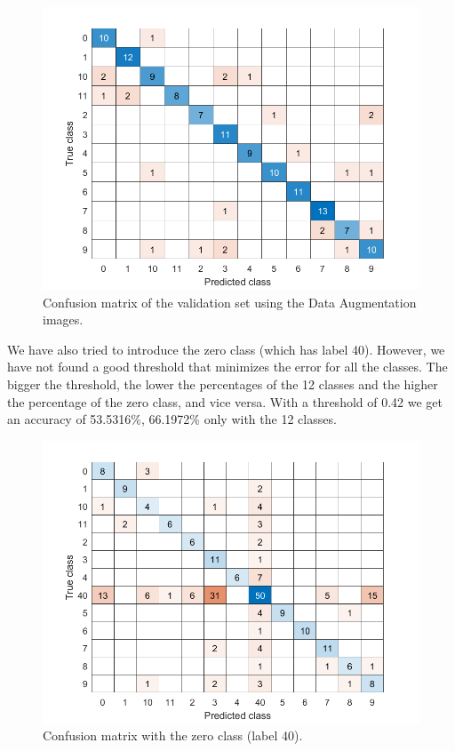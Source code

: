 \documentclass[11]{article}
\begin{document}
\begin{figure}[H]
\begin{minipage}{0.4\linewidth}
  \includegraphics[scale=0.33]{images/secondOne.png}
  \caption{Confusion matrix of the validation set using the Data Augmentation images.}
    \label{plot:speed-gauss}
\end{minipage}
\end{figure}

We have also tried to introduce the zero class (which has label 40). However, we have not found a good threshold that minimizes the error for all the classes. The bigger the threshold, the lower the percentages of the 12 classes and the higher the percentage of the zero class, and vice versa. With a threshold of 0.42 we get an accuracy of 53.5316\%, 66.1972\% only with the 12 classes.

\begin{figure}[H]
	\centering
	\includegraphics[scale=0.45]{images/finaldetot.png}
	
	\caption{Confusion matrix with the zero class (label 40).}
\end{figure}
\end{document}
